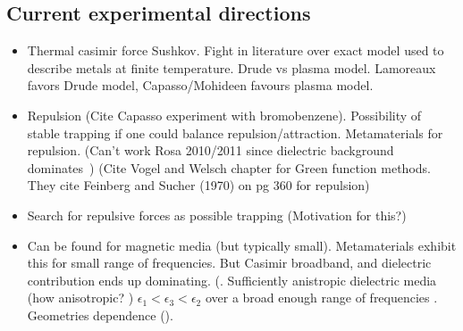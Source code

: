 \subsection{Current experimental directions}
\begin{itemize}
\item Thermal casimir force
Sushkov\cite{Sushkov2011}.
Fight in literature over exact model used to describe metals at finite temperature.
Drude vs plasma model.  
 Lamoreaux favors Drude model, Capasso/Mohideen favours plasma model.
\item Repulsion (Cite Capasso experiment with bromobenzene).  Possibility of stable trapping
  if one could balance repulsion/attraction.  
 Metamaterials for repulsion.  (Can't work Rosa 2010/2011 since dielectric
  background dominates~\cite{Rosa2008})
  (Cite Vogel and Welsch chapter for Green function methods.  They cite 
  Feinberg and Sucher (1970) on pg 360 for repulsion)
  \item Search for repulsive forces as possible trapping (Motivation for this?)
  \item Can be found for magnetic media (but typically small).
    Metamaterials exhibit this for small range of frequencies.
    But Casimir broadband, and dielectric contribution ends up dominating.
    (.
    Sufficiently anistropic dielectric media (how anisotropic? )
    $\epsilon_1<\epsilon_3<\epsilon_2$ over a broad enough range of frequencies 
    .
    Geometries dependence ().
    


\end{itemize}
